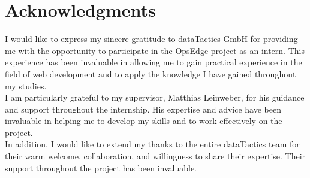 
\begingroup
\let\clearpage\relax
\let\cleardoublepage\relax
\let\cleardoublepage\relax
\chapter*{Acknowledgments}
I would like to express my sincere gratitude to dataTactics GmbH for providing
me with the opportunity to participate in the OpsEdge project as an intern.
This experience has been invaluable in allowing me to gain practical experience
in the field of web development and to apply the knowledge I have gained
throughout my studies.\\

I am particularly grateful to my supervisor, Matthias Leinweber, for his
guidance and support throughout the internship. His expertise and advice have
been invaluable in helping me to develop my skills and to work effectively on
the project.\\

In addition, I would like to extend my thanks to the entire dataTactics team
for their warm welcome, collaboration, and willingness to share their
expertise. Their support throughout the project has been invaluable.
\endgroup
